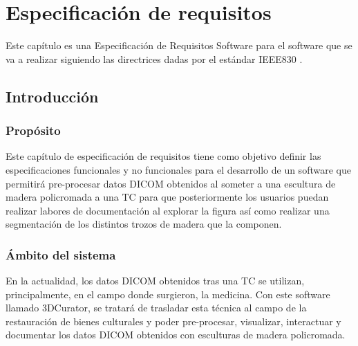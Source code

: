 \chapter{Especificación de requisitos}

Este capítulo es una Especificación de Requisitos Software para el software que se va a realizar siguiendo las directrices dadas por el estándar IEEE830 \cite{iee830}.

\section{Introducción}

\subsection{Propósito}

Este capítulo de especificación de requisitos tiene como objetivo definir las especificaciones funcionales y no funcionales para el desarrollo de un software que permitirá pre-procesar datos DICOM obtenidos al someter a una escultura de madera policromada a una TC para que posteriormente los usuarios puedan realizar labores de documentación al explorar la figura así como realizar una segmentación de los distintos trozos de madera que la componen. 

\subsection{Ámbito del sistema}

En la actualidad, los datos DICOM obtenidos tras una TC se utilizan, principalmente, en el campo donde surgieron, la medicina. Con este software llamado 3DCurator, se tratará de trasladar esta técnica al campo de la restauración de bienes culturales y poder pre-procesar, visualizar, interactuar y documentar los datos DICOM obtenidos con esculturas de madera policromada.